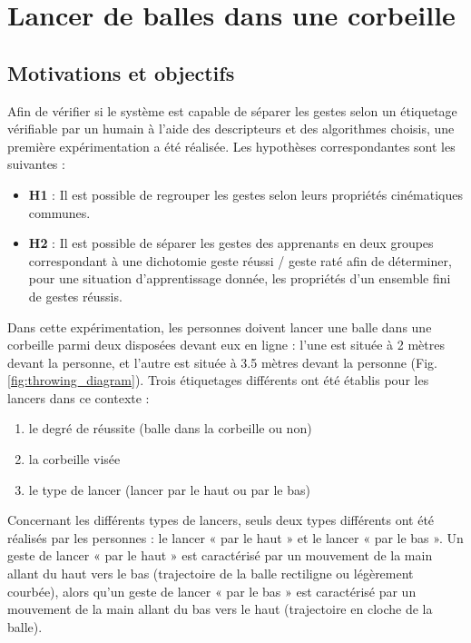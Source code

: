 \section{Lancer de balles dans une corbeille}
\subsection{Motivations et objectifs}
Afin de vérifier si le système est capable de séparer les gestes selon un étiquetage vérifiable par un humain à l'aide des descripteurs et des algorithmes choisis, une première expérimentation a été réalisée. Les hypothèses correspondantes sont les suivantes :
\begin{itemize}
    \item \textbf{H1} : Il est possible de regrouper les gestes selon leurs propriétés cinématiques communes.
	\item \textbf{H2} : Il est possible de séparer les gestes des apprenants en deux groupes correspondant à une dichotomie geste réussi / geste raté afin de déterminer, pour une situation d'apprentissage donnée, les propriétés d'un ensemble fini de gestes réussis.
\end{itemize}

Dans cette expérimentation, les personnes doivent lancer une balle dans une corbeille parmi deux disposées devant eux en ligne : l'une est située à 2 mètres devant la personne, et l'autre est située à 3.5 mètres devant la personne (Fig. \ref{fig:throwing_diagram}). Trois étiquetages différents ont été établis pour les lancers dans ce contexte :

\begin{enumerate}[label=(\roman*)]
	\item le degré de réussite (balle dans la corbeille ou non)
	\item la corbeille visée
	\item le type de lancer (lancer par le haut ou par le bas)
\end{enumerate}

Concernant les différents types de lancers, seuls deux types différents ont été réalisés par les personnes : le lancer « par le haut » et le lancer « par le bas ». Un geste de lancer « par le haut » est caractérisé par un mouvement de la main allant du haut vers le bas (trajectoire de la balle rectiligne ou légèrement courbée), alors qu'un geste de lancer « par le bas » est caractérisé par un mouvement de la main allant du bas vers le haut (trajectoire en cloche de la balle).

